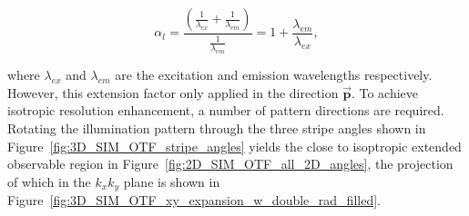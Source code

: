 \begin{equation}\label{eq:lateral_res_extension_factor}
\alpha_{l} = \frac{\left(\frac{1}{\lambda_{ex}} + \frac{1}{\lambda_{em}}\right)}{\frac{1}{\lambda_{em}}} = 1 + \frac{\lambda_{em}}{\lambda_{ex}},
\end{equation}

where $\lambda_{ex}$ and $\lambda_{em}$ are the excitation and emission
wavelengths respectively.  However, this extension factor only applied in 
the direction $\overrightarrow{\textbf{p}}$. To achieve isotropic 
resolution enhancement, a number of pattern directions are required. 
Rotating the illumination pattern through the three stripe angles shown 
in Figure~\ref{fig:3D_SIM_OTF_stripe_angles} yields the close to isoptropic extended 
observable region in Figure~\ref{fig:2D_SIM_OTF_all_2D_angles}, the 
projection of which in the $k_{x}k_{y}$ plane is shown in
Figure~\ref{fig:3D_SIM_OTF_xy_expansion_w_double_rad_filled}. 

